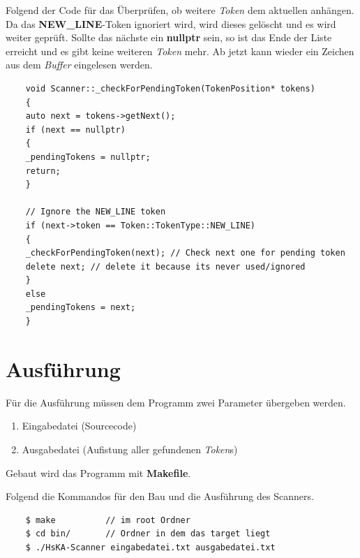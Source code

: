 \documentclass[
a4paper
]{scrreprt}
\begin{document}
	Folgend der Code für das Überprüfen, ob weitere \textit{Token} dem aktuellen anhängen. Da das \textbf{NEW\_LINE}-Token ignoriert wird, wird dieses gelöscht und es wird weiter geprüft. Sollte das nächste ein \textbf{nullptr} sein, so ist das Ende der Liste erreicht und es gibt keine weiteren \textit{Token} mehr. Ab jetzt kann wieder ein Zeichen aus dem \textit{Buffer} eingelesen werden.
	
	\begin{lstlisting}
	void Scanner::_checkForPendingToken(TokenPosition* tokens)
	{
	auto next = tokens->getNext();
	if (next == nullptr)
	{
	_pendingTokens = nullptr;
	return;
	}
	
	// Ignore the NEW_LINE token
	if (next->token == Token::TokenType::NEW_LINE)
	{
	_checkForPendingToken(next); // Check next one for pending token
	delete next; // delete it because its never used/ignored
	}
	else
	_pendingTokens = next;
	}
	\end{lstlisting}
	
	
	\section{Ausführung}
	Für die Ausführung müssen dem Programm zwei Parameter übergeben werden.
	
	\begin{enumerate}
		\item Eingabedatei (Sourcecode)
		\item Ausgabedatei (Aufistung aller gefundenen \textit{Token}s)
	\end{enumerate}
	
	Gebaut wird das Programm mit \textbf{Makefile}.
	
	Folgend die Kommandos für den Bau und die Ausführung des Scanners.
	
	\begin{lstlisting}
	$ make 			// im root Ordner
	$ cd bin/		// Ordner in dem das target liegt
	$ ./HsKA-Scanner eingabedatei.txt ausgabedatei.txt
	\end{lstlisting}
	
	
\end{document}

